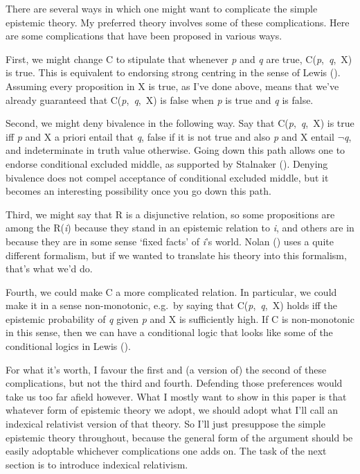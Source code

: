 \documentclass[
  11pt,
  letterpaper,
  DIV=11,
  numbers=noendperiod,
  oneside]{scrartcl}
\begin{document}
There are several ways in which one might want to complicate the simple
epistemic theory. My preferred theory involves some of these
complications. Here are some complications that have been proposed in
various ways.

First, we might change C to stipulate that whenever \emph{p} and
\emph{q} are true, C(\emph{p},~\emph{q},~X) is true. This is equivalent
to endorsing strong centring in the sense of Lewis
(). Assuming every proposition in X is
true, as I've done above, means that we've already guaranteed that
C(\emph{p},~\emph{q},~X) is false when \emph{p} is true and \emph{q} is
false.

Second, we might deny bivalence in the following way. Say that
C(\emph{p},~\emph{q},~X) is true iff \emph{p} and X a priori entail that
\emph{q}, false if it is not true and also \emph{p} and X entail
\(\neg\)\emph{q}, and indeterminate in truth value otherwise. Going down
this path allows one to endorse conditional excluded middle, as
supported by Stalnaker (). Denying
bivalence does not compel acceptance of conditional excluded middle, but
it becomes an interesting possibility once you go down this path.

Third, we might say that R is a disjunctive relation, so some
propositions are among the R(\emph{i}) because they stand in an
epistemic relation to \emph{i}, and others are in because they are in
some sense `fixed facts' of \emph{i}'s world. Nolan
() uses a quite different formalism, but
if we wanted to translate his theory into this formalism, that's what
we'd do.

Fourth, we could make C a more complicated relation. In particular, we
could make it in a sense non-monotonic, e.g.~by saying that
C(\emph{p},~\emph{q},~X) holds iff the epistemic probability of \emph{q}
given \emph{p} and X is sufficiently high. If C is non-monotonic in this
sense, then we can have a conditional logic that looks like some of the
conditional logics in Lewis ().

For what it's worth, I favour the first and (a version of) the second of
these complications, but not the third and fourth. Defending those
preferences would take us too far afield however. What I mostly want to
show in this paper is that whatever form of epistemic theory we adopt,
we should adopt what I'll call an indexical relativist version of that
theory. So I'll just presuppose the simple epistemic theory throughout,
because the general form of the argument should be easily adoptable
whichever complications one adds on. The task of the next section is to
introduce indexical relativism.
\end{document}
